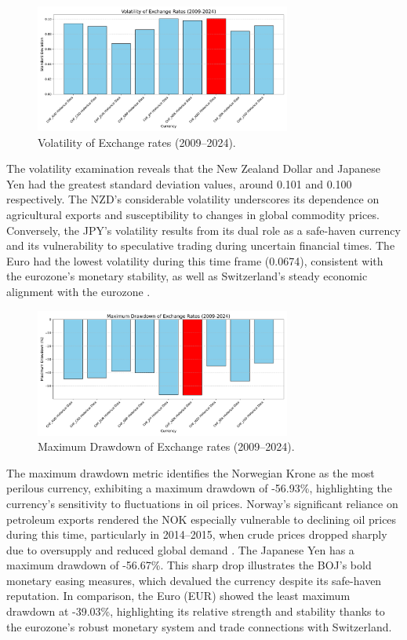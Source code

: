 \documentclass[11pt,a4paper,english,oneside]{book}
\begin{document}
\begin{figure}[h!]
    \centering
    \includegraphics[width=0.75\textwidth]{../../images/volatility_2009_2024.pdf}
    \caption{Volatility of Exchange rates (2009--2024).}
    \label{fig:volatility_2009_2024}
\end{figure}

The volatility examination reveals that the New Zealand Dollar and Japanese Yen had the greatest standard deviation values, around 0.101 and 0.100 respectively. The NZD's considerable volatility underscores its dependence on agricultural exports and susceptibility to changes in global commodity prices. Conversely, the JPY's volatility results from its dual role as a safe-haven currency and its vulnerability to speculative trading during uncertain financial times. The Euro had the lowest volatility during this time frame (0.0674), consistent with the eurozone's monetary stability, as well as Switzerland's steady economic alignment with the eurozone \parencite{claessens2010cross}.

\begin{figure}[h!]
    \centering
    \includegraphics[width=0.75\textwidth]{../../images/maximum_drawdown_2009_2024.pdf}
    \caption{Maximum Drawdown of Exchange rates (2009--2024).}
    \label{fig:maximum_drawdown_2009_2024}
\end{figure}

The maximum drawdown metric identifies the Norwegian Krone as the most perilous currency, exhibiting a maximum drawdown of -56.93\%, highlighting the currency’s sensitivity to fluctuations in oil prices. Norway's significant reliance on petroleum exports rendered the NOK especially vulnerable to declining oil prices during this time, particularly in 2014–2015, when crude prices dropped sharply due to oversupply and reduced global demand \parencite{bergholt2016business}. The Japanese Yen has a maximum drawdown of -56.67\%. This sharp drop illustrates the BOJ's bold monetary easing measures, which devalued the currency despite its safe-haven reputation. In comparison, the Euro (EUR) showed the least maximum drawdown at -39.03\%, highlighting its relative strength and stability thanks to the eurozone's robust monetary system and trade connections with Switzerland.
\end{document}
